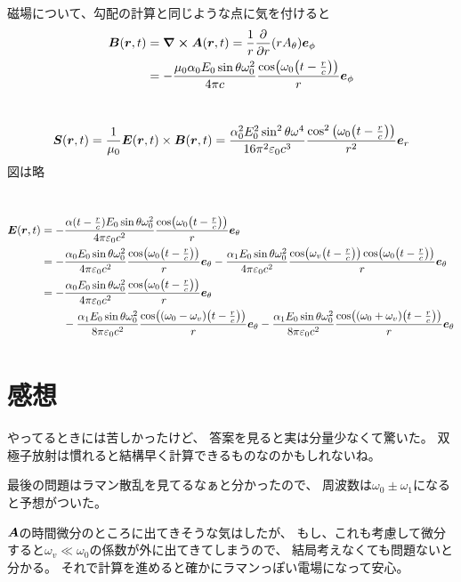 \documentclass[../ap_2021.tex]{subfiles}
\begin{document}
磁場について、勾配の計算と同じような点に気を付けると
\begin{equation}\begin{aligned}[b]
    \vb*{B}(\vb*{r},t)&=\curl \vb*{A}(\vb*{r},t) = \frac{1}{r}\pdv{r}(rA_\theta)\vb*{e}_\phi\\
    &= -\frac{\mu_0\alpha_0E_0\sin\theta \omega_0^2}{4\pi c}\frac{\cos(\omega_0\qty(t-\frac{r}{c}))}{r}\vb*{e}_\phi
\end{aligned}\end{equation}

\section{}
\begin{equation}\begin{aligned}[b]
    \vb*{S}(\vb*{r},t)=\frac{1}{\mu_0}\vb*{E}(\vb*{r},t)\times \vb*{B}(\vb*{r},t)
    = \frac{\alpha_0^2E_0^2\sin^2\theta \omega^4}{16\pi^2\varepsilon_0c^3}\frac{\cos^2\qty(\omega_0\qty(t-\frac{r}{c}))}{r^2}\vb*{e}_r
\end{aligned}\end{equation}
図は略

\section{}
\begin{equation}\begin{aligned}[b]
    \vb*{E}(\vb*{r},t)&=-\frac{\alpha(t-\frac{r}{c})E_0\sin\theta\omega_0^2}{4\pi\varepsilon_0c^2}\frac{\cos(\omega_0\qty(t-\frac{r}{c}))}{r}\vb*{e}_\theta\\
    &=-\frac{\alpha_0E_0\sin\theta\omega_0^2}{4\pi\varepsilon_0c^2}\frac{\cos(\omega_0\qty(t-\frac{r}{c}))}{r}\vb*{e}_\theta
        -\frac{\alpha_1E_0\sin\theta\omega_0^2}{4\pi\varepsilon_0c^2}\frac{\cos(\omega_v\qty(t-\frac{r}{c}))\cos(\omega_0\qty(t-\frac{r}{c}))}{r}\vb*{e}_\theta\\
    &=-\frac{\alpha_0E_0\sin\theta\omega_0^2}{4\pi\varepsilon_0c^2}\frac{\cos(\omega_0\qty(t-\frac{r}{c}))}{r}\vb*{e}_\theta\\
        &\qquad-\frac{\alpha_1E_0\sin\theta\omega_0^2}{8\pi\varepsilon_0c^2}\frac{\cos((\omega_0-\omega_v)\qty(t-\frac{r}{c}))}{r}\vb*{e}_\theta
        -\frac{\alpha_1E_0\sin\theta\omega_0^2}{8\pi\varepsilon_0c^2}\frac{\cos((\omega_0+\omega_v)\qty(t-\frac{r}{c}))}{r}\vb*{e}_\theta\\
\end{aligned}\end{equation}


\section*{感想}
やってるときには苦しかったけど、
答案を見ると実は分量少なくて驚いた。
双極子放射は慣れると結構早く計算できるものなのかもしれないね。

最後の問題はラマン散乱を見てるなぁと分かったので、
周波数は\(\omega_0\pm\omega_1\)になると予想がついた。

\(\vb*{A}\)の時間微分のところに出てきそうな気はしたが、
もし、これも考慮して微分すると\(\omega_v\ll\omega_0\)の係数が外に出てきてしまうので、
結局考えなくても問題ないと分かる。
それで計算を進めると確かにラマンっぽい電場になって安心。
\end{document}
